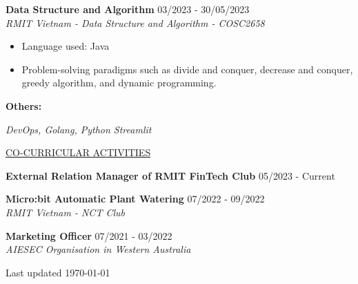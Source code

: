 \documentclass[11pt]{article}
\newcommand{\betteruline}[1]{
    \uline{#1}
}
\newcommand{\sectiontitle}[1]{
    \begingroup
        \titlebold
        \betteruline{\Large\uppercase{#1}  }
        \vspace{1.7mm}
    \endgroup
}
\newcommand{\sectioncontent}[1]{
    \begingroup
        \begin{FlushLeft}
        \vspace{-3mm}
        \sffamily\small#1
        \end{FlushLeft}
    \endgroup
    \vspace{2mm}
}
\newcommand{\project}[2]{
    \begingroup
        \textbf{\small#1}
        \hfill\color{black!70}\small{#2}
    \endgroup
}
\newcommand{\spacevv}{
    \vspace{2mm}
}
\begin{document}
\begin{paracol}{2}
{       \project{Data Structure and Algorithm}{03/2023 - 30/05/2023} \\
    \vspace{1mm}
        \textcolor{black!70}{\textit{RMIT Vietnam - Data Structure and Algorithm - COSC2658}}
        \vspace{1mm}
        \begin{itemize}
            \item Language used: Java
            \vspace{1mm} 
            \item Problem-solving paradigms such as divide and conquer, decrease and conquer, greedy algorithm, and dynamic programming.
            \vspace{1mm} 
        \end{itemize}
        \spacevv

        \project{Others:}{}
    \vspace{1mm}
        {\textit{DevOps, Golang, Python Streamlit}}
        \spacevv
        
    }

    \sectiontitle{CO-CURRICULAR ACTIVITIES}
    \sectioncontent{
    \vspace{1mm}

        \project{External Relation Manager of RMIT FinTech Club}{05/2023 - Current} \\
            \vspace{1mm} 
          \spacevv
        
        \project{Micro:bit Automatic Plant Watering}{07/2022 - 09/2022} \\
            \textcolor{black!70}{\textit{RMIT Vietnam - NCT Club}}
            \vspace{1mm} 
            \spacevv

        \project{Marketing Officer}{07/2021 - 03/2022} \\
            \textcolor{black!70}{\textit{AIESEC Organisation in Western Australia}}
            \vspace{1mm} 
            \spacevv
    
    }

    \normaltext \hfill \tiny Last updated \today

    \end{paracol}
\end{document}
